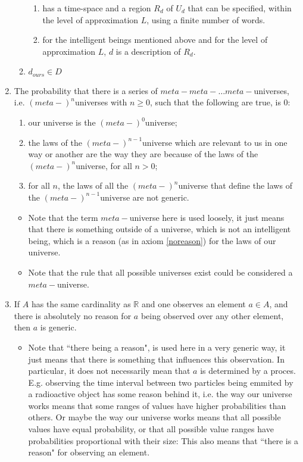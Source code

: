 \documentclass[a4paper
,draft
]{article}
\newcommand{\svn}[2][]{\todo[author=Virgil,color=red!25!white,#1]{#2}}
\def\reale{\mathbb{R}}
\newcommand{\ghilimele}[1]{``#1"}
\begin{document}
\begin{enumerate}
\begin{enumerate}
\begin{enumerate}
        \item has a time-space and a region $R_d$ of $U_d$ that can be specified, within the level of approximation $L$, using a finite number of words.
        \item for the intelligent beings mentioned above and for the level of approximation $L$, $d$ is a description of $R_d$.
      \end{enumerate}
    \item $d_{ours}\in D$
  \end{enumerate}
\item \label{infinitechain} The probability that there is a series of $meta-meta-\dots meta-$universes, i.e. $(meta-)^n$universes with $n\ge 0$, such that the following are true, is $0$:
  \begin{enumerate}
    \item our universe is the $(meta-)^0$universe;
    \item the laws of the $(meta-)^{n-1}$universe which are relevant to us in one way or another are the way they are because of the laws of the $(meta-)^n$universe, for all $n > 0$;
    \item for all $n$, the laws of all the $(meta-)^n$universe that define the laws of the $(meta-)^{n-1}$universe are not generic.
  \end{enumerate}
  \begin{itemize}
    \item Note that the term $meta-$universe here is used loosely, it just means that there is something outside of a universe, which is not an intelligent being, which is a reason (as in axiom \ref{noreason}) for the laws of our universe.
    \item Note that the rule\svn{This is not a rule.} that all possible universes exist could be considered a $meta-$universe.
  \end{itemize}
\item \label{noreason} If $A$ has the same cardinality as $\reale$ and one observes an element $a\in A$, and there is absolutely no reason for $a$ being observed over any other element, then $a$ is generic.
  \begin{itemize}
    \item Note that \ghilimele{there being a reason}, is used here in a very generic way, it just means that there is something that influences this observation. In particular, it does not necessarily mean that $a$ is determined by a proces. E.g. observing the time interval between two particles being emmited by a radioactive object has some reason behind it, i.e. the way our universe works means that some ranges of values have higher probabilities than others. Or maybe the way our universe works means that all possible values have equal probability, or that all possible value ranges have probabilities proportional with their size: This also means that \ghilimele{there is a reason} for observing an element.

\end{itemize}
\end{enumerate}
\end{document}
